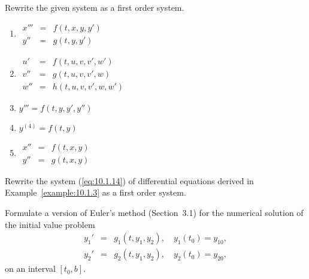 \documentclass{ximera}
\begin{document}
\begin{problem}\label{exer:10.1.5}
 Rewrite the given system as a first order system.

\begin{enumerate}
    \item $\begin{array}{rcl} x''' &=& f(t,x,y,y')\\ 
    y'' &=&g(t,y,y') \end{array}$
    \item $\begin{array}{rcl} u' &=&f(t,u,v,v',w')\\ v''&=&g(t,u,v,v',w)
\\w''&=&h(t,u,v,v',w,w')\end{array}$
\item $y''' =f(t,y,y',y'')$
\item $y^{(4)} = f(t,y)$
\item $\begin{array}{rcl} x'' &=& f(t,x,y)\\ y'' &=&
g(t,x,y) \end{array}$
\end{enumerate}


\end{problem}

\begin{problem}\label{exer:10.1.6}
Rewrite the system (\ref{eq:10.1.14}) of differential equations derived in
Example~\ref{example:10.1.3}   as a first order system.
\end{problem}

\begin{problem}\label{exer:10.1.7}
Formulate a version of Euler's method (Section~3.1)
for the numerical solution of the initial value problem
$$
\begin{array}{rcl}
y_1'&=&g_1(t,y_1,y_2),\quad y_1(t_0)=y_{10},\\
y_2'&=&g_2(t,y_1,y_2),\quad y_2(t_0)=y_{20},
\end{array}
$$
on an interval $[t_0,b]$.
\end{problem}
\end{document}
